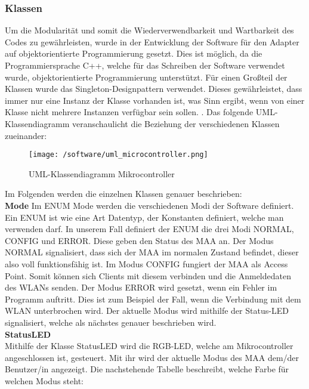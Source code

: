 \documentclass[11pt, twoside]{article}
\begin{document}
\subsubsection{Klassen}
Um die Modularität und somit die Wiederverwendbarkeit und Wartbarkeit des Codes zu gewährleisten, wurde in der Entwicklung der Software für den Adapter auf objektorientierte Programmierung gesetzt. Dies ist möglich, da die Programmiersprache C++, welche für das Schreiben der Software verwendet wurde, objektorientierte Programmierung unterstützt. Für einen Großteil der Klassen wurde das Singleton-Designpattern verwendet. Dieses gewährleistet, dass immer nur eine Instanz der Klasse vorhanden ist, was Sinn ergibt, wenn von einer Klasse nicht mehrere Instanzen verfügbar sein sollen. \parencite[vgl.][]{noauthor_urlpi14_nodate}. Das folgende UML-Klassendiagramm veranschaulicht die Beziehung der verschiedenen Klassen zueinander:
\begin{figure}[H]
	\texttt{[image: /software/uml\_microcontroller.png]}
	\caption{UML-Klassendiagramm Mikrocontroller}
\end{figure}
\noindent
Im Folgenden werden die einzelnen Klassen genauer beschrieben: \\
\textbf{Mode} \newline
Im ENUM \glqq Mode\grqq{} werden die verschiedenen Modi der Software definiert. Ein ENUM ist wie eine Art Datentyp, der Konstanten definiert, welche man verwenden darf. \parencite[vgl.][]{noauthor_urlpi15_nodate} In unserem Fall definiert der ENUM die drei Modi \glqq NORMAL\grqq{}, \glqq CONFIG\grqq{} und \glqq ERROR\grqq{}. Diese geben den Status des MAA an. Der Modus \glqq NORMAL\grqq{} signalisiert, dass sich der MAA im normalen Zustand befindet, dieser also voll funktionsfähig ist. Im Modus \glqq CONFIG\grqq{} fungiert der MAA als Access Point. Somit können sich Clients mit diesem verbinden und die Anmeldedaten des WLANs senden. Der Modus \glqq ERROR\grqq{} wird gesetzt, wenn ein Fehler im Programm auftritt. Dies ist zum Beispiel der Fall, wenn die Verbindung mit dem WLAN unterbrochen wird. Der aktuelle Modus wird mithilfe der Status-LED signalisiert, welche als nächstes genauer beschrieben wird. \newline \\
\textbf{StatusLED} \\
Mithilfe der Klasse \glqq StatusLED\grqq{} wird die RGB-LED, welche am Mikrocontroller angeschlossen ist, gesteuert. Mit ihr wird der aktuelle Modus des MAA dem/der Benutzer/in angezeigt. Die nachstehende Tabelle beschreibt, welche Farbe für welchen Modus steht: \newline \\
\end{document}
